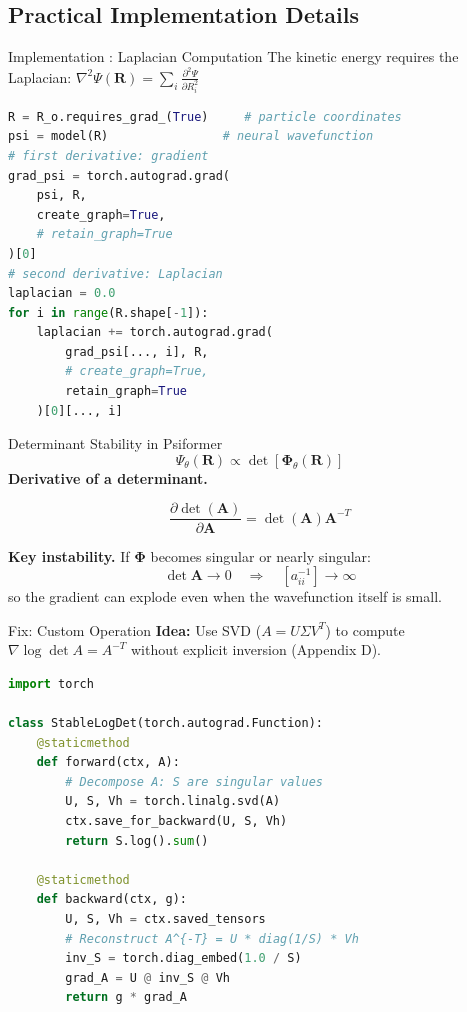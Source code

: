 \documentclass{beamer}
\begin{document}
\subsection{Practical Implementation Details}
\begin{frame}[fragile]{Implementation : Laplacian Computation}
The kinetic energy requires the Laplacian: $\nabla^2 \Psi(\mathbf{R}) = \sum_i \frac{\partial^2 \Psi}{\partial R_i^2}$
\begin{lstlisting}[language=Python]
R = R_o.requires_grad_(True)     # particle coordinates
psi = model(R)                # neural wavefunction
# first derivative: gradient
grad_psi = torch.autograd.grad(
    psi, R,
    create_graph=True,
    # retain_graph=True
)[0]
# second derivative: Laplacian
laplacian = 0.0
for i in range(R.shape[-1]):
    laplacian += torch.autograd.grad(
        grad_psi[..., i], R,
        # create_graph=True,
        retain_graph=True
    )[0][..., i]
\end{lstlisting}
\end{frame}

\begin{frame}{Determinant Stability in Psiformer}
\[
  \Psi_{\theta}(\mathbf{R}) \propto \det [\boldsymbol{\Phi}_{\theta}(\mathbf{R})]
\]
\textbf{Derivative of a determinant.}

$$
\frac{\partial \det(\mathbf{A})}{\partial \mathbf{A}}=\det(\mathbf{A})\mathbf{A}^{-T}
$$

\textbf{Key instability.}
If $\boldsymbol{\Phi}$ becomes singular or nearly singular:
\[
  \det \mathbf{A} \to 0 \quad \Rightarrow \quad [a_{ii}^{-1}] \to \infty
\]
so the gradient can explode even when the wavefunction itself is small.


\end{frame}

\begin{frame}[fragile]{Fix: Custom Operation}
    \textbf{Idea:} Use SVD ($A = U\Sigma V^T$) to compute $\nabla \log \det A = A^{-T}$ without explicit inversion (Appendix D).

    \begin{lstlisting}[language=Python, basicstyle=\ttfamily\scriptsize]
import torch

class StableLogDet(torch.autograd.Function):
    @staticmethod
    def forward(ctx, A):
        # Decompose A: S are singular values
        U, S, Vh = torch.linalg.svd(A)
        ctx.save_for_backward(U, S, Vh)
        return S.log().sum()

    @staticmethod
    def backward(ctx, g):
        U, S, Vh = ctx.saved_tensors
        # Reconstruct A^{-T} = U * diag(1/S) * Vh
        inv_S = torch.diag_embed(1.0 / S)
        grad_A = U @ inv_S @ Vh
        return g * grad_A
    \end{lstlisting}
\end{frame}
\end{document}
